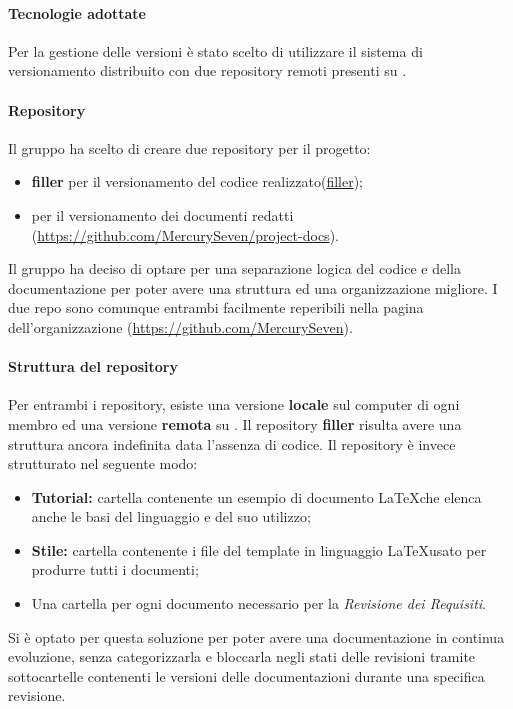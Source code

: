 \paragraph{Tecnologie adottate}
Per la gestione delle versioni è stato scelto di utilizzare il sistema di versionamento distribuito  con due repository remoti presenti su .
\paragraph{Repository}
Il gruppo \textit{\Gruppo{}} ha scelto di creare due repository per il progetto:
\begin{itemize}
	\item \textbf{filler} per il versionamento del codice realizzato(\url{filler});
	\item \textbf{\repoDoc{}} per il versionamento dei documenti redatti (\url{https://github.com/MercurySeven/project-docs}).
\end{itemize}
Il gruppo ha deciso di optare per una separazione logica del codice e della documentazione per poter avere una struttura ed una organizzazione migliore. I due repo sono comunque entrambi facilmente reperibili nella pagina dell'organizzazione (\url{https://github.com/MercurySeven}).
\paragraph{Struttura del repository}
Per entrambi i repository, esiste una versione \textbf{locale} sul computer di ogni membro ed una versione \textbf{remota} su .\newline
Il repository \textbf{filler} risulta avere una struttura ancora indefinita data l'assenza di codice.\newline
Il repository \textbf{\repoDoc} è invece strutturato nel seguente modo:
\begin{itemize}
	\item \textbf{Tutorial:} cartella contenente un esempio di documento \LaTeX che elenca anche le basi del linguaggio e del suo utilizzo; 
	\item \textbf{Stile:} cartella contenente i file del template in linguaggio \LaTeX usato per produrre tutti i documenti;
	\item Una cartella per ogni documento necessario per la \textit{Revisione dei Requisiti}.
\end{itemize}
Si è optato per questa soluzione per poter avere una documentazione in continua evoluzione, senza categorizzarla e bloccarla negli stati delle revisioni tramite sottocartelle contenenti le versioni delle documentazioni durante una specifica revisione.
